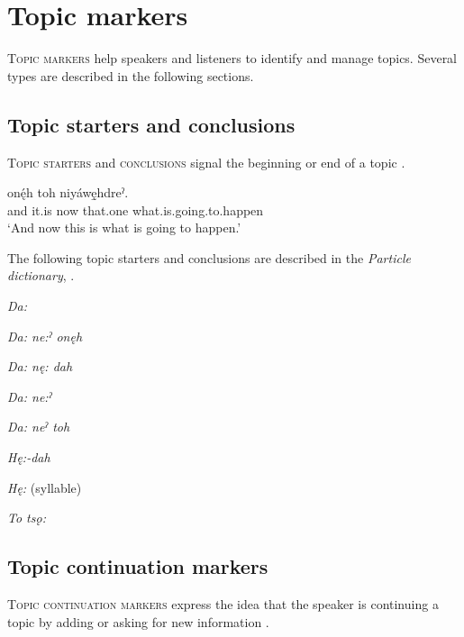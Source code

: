 \section{Topic markers} \label{ch:Topic markers}
\textsc{Topic markers} help speakers and listeners to identify and manage topics. Several types are described in the following sections.


\subsection{Topic starters and conclusions} \label{ch:Topic starters and conclusions}
\textsc{Topic starters} and \textsc{conclusions} signal the beginning or end of a topic .  

\ea\label{ex:startendtopic}
 \gll {}  onę́h toh niyáwę̱hdreˀ. \\
and it.is now that.one what.is.going.to.happen\\
\glt ‘And now this is what is going to happen.’
\z

The following topic starters and conclusions are described in the \textit{Particle dictionary}, .

\begin{CayugaRelated}
\item{}\textit{Da:} \\
\item{}\textit{Da: ne:ˀ onęh} \\
\item{}\textit{Da: nę: dah} \\
\item{}\textit{Da: ne:ˀ} \\
\item{}\textit{Da: neˀ toh} \\
\item{}\textit{Hę:-dah} \\
\item{}\textit{Hę:} (syllable)\\
\item{}\textit{To tsǫ:} \\
\end{CayugaRelated}



\subsection{Topic continuation markers} \label{ch:Topic continuation markers}
\textsc{Topic continuation markers} express the idea that the speaker is continuing a topic by adding or asking for new information . 

